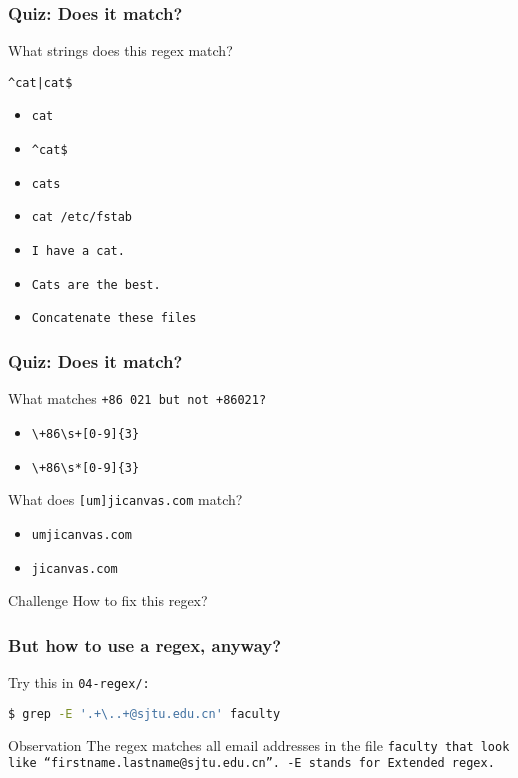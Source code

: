 \begin{frame}[fragile]
    \frametitle{Quiz: Does it match?}
    What strings does this regex match? \newline

    \Large \verb!^cat|cat$! \normalsize

    \begin{itemize}
        \item \verb|cat|                      %
        \item \verb|^cat$|                    %
        \item \verb|cats|                     %
        \item \verb|cat /etc/fstab|           %
        \item \verb|I have a cat.|            %
        \item \verb|Cats are the best.|       %
        \item \verb|Concatenate these files|  %
    \end{itemize}
\end{frame}

\begin{frame}[fragile]
    \frametitle{Quiz: Does it match?}
    What matches \tt{+86 021} but not \tt{+86021}?
    \begin{itemize}
        \item \verb|\+86\s+[0-9]{3}| %
        \item \verb|\+86\s*[0-9]{3}|
    \end{itemize}

    What does \Large \verb|[um]jicanvas.com| \normalsize match?
    \begin{itemize}
        \item \tt{umjicanvas.com}
        \item \tt{jicanvas.com} %
    \end{itemize}

    \begin{block}{Challenge}
        How to fix this regex? %
    \end{block}
\end{frame}

\begin{frame}[fragile]
    \frametitle{But how to use a regex, anyway?}
    Try this in \tt{04-regex/}:
    \begin{lstlisting}[language=bash]
$ grep -E '.+\..+@sjtu.edu.cn' faculty
\end{lstlisting}
    \pause
    \begin{block}{Observation}
        The regex matches all email addresses in the file \tt{faculty}
        that look like ``firstname.lastname@sjtu.edu.cn''.
        \newline \newline
        \tt{-E} stands for Extended regex.
    \end{block}
\end{frame}

